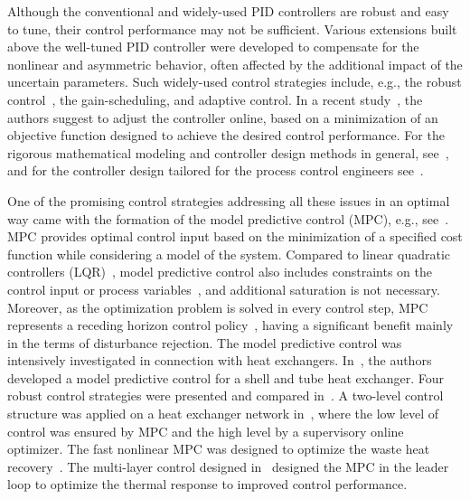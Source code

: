 \documentclass[preprint,12pt]{elsarticle}
\begin{document}
	Although the conventional and widely-used PID controllers are robust and easy to tune, their control performance may not be sufficient. Various extensions built above the well-tuned PID controller were developed to compensate for the nonlinear and asymmetric behavior, often affected by the additional impact of the uncertain parameters. Such widely-used control strategies include, e.g., the robust control~\cite{WY18}, the gain-scheduling, and adaptive control. In a recent study~\cite{VANNIEKERK_tuning}, the authors suggest to adjust the controller online, based on a minimization of an objective function designed to achieve the desired control performance. %
	For the rigorous mathematical modeling and controller design methods in general, see~\cite{MF08}, and for the controller design tailored for the process control engineers see~\cite{Liptak}.
	
	One of the promising control strategies addressing all these issues in an optimal way came with the formation of the model predictive control (MPC), e.g., see~\cite{Morari_MPC}. MPC provides optimal control input based on the minimization of a specified cost function while considering a model of the system. Compared to linear quadratic controllers (LQR)~\cite{LQR}, model predictive control also includes constraints on the control input or process variables~\cite{Maciejowski_MPC}, and additional saturation is not necessary. Moreover, as the optimization problem is solved in every control step, MPC represents a receding horizon control policy~\cite{receding_horizon}, having a significant benefit mainly in the terms of disturbance rejection. The model predictive control was intensively investigated in connection with heat exchangers. In~\cite{Vinaya_HE_MPC}, the authors developed a model predictive control for a shell and tube heat exchanger. %
	Four robust control strategies were presented and compared in~\cite{Oravec_HE_ATE}. A two-level control structure was applied on a heat exchanger network in~\cite{Gonzales_HE_MPC}, where the low level of control was ensured by MPC and the high level by a supervisory online optimizer. The fast nonlinear MPC was designed to optimize the waste heat recovery~\cite{WC19}. The multi-layer control designed in~\cite{DZ18} designed the MPC in the leader loop to optimize the thermal response to improved control performance. %
	
\end{document}
